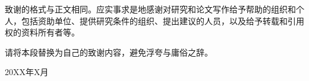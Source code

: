 致谢的格式与正文相同。应实事求是地感谢对研究和论文写作给予帮助的组织和个人，包括资助单位、提供研究条件的组织、提出建议的人员，以及给予转载和引用权的资料所有者等。

请将本段替换为自己的致谢内容，避免浮夸与庸俗之辞。
\begin{flushright}20XX年X月\end{flushright}

